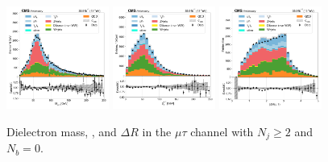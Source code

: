 \begin{figure}[htb!]
    \centering
    \includegraphics[width=0.3\textwidth]{chapters/Appendix/sectionPlots/figures/data_mc_overlays/mutau_2016_cat_gt2_eq0_signal_linear_lepton_dilepton1_mass}
    \includegraphics[width=0.3\textwidth]{chapters/Appendix/sectionPlots/figures/data_mc_overlays/mutau_2016_cat_gt2_eq0_signal_linear_lepton_dilepton1_pt}
    \includegraphics[width=0.3\textwidth]{chapters/Appendix/sectionPlots/figures/data_mc_overlays/mutau_2016_cat_gt2_eq0_signal_linear_lepton_dilepton1_delta_r}
    \caption{Dielectron mass, \pt, and $\Delta R$ in the $\mu\tau$ channel
    with $N_{j} \geq 2$ and $N_{b} = 0$.}
    \label{fig:mutau_4_dilepton}
\end{figure}

